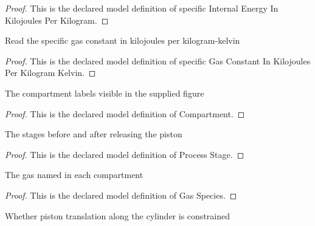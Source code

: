 \begin{proof}
  This is the declared model definition of specific Internal Energy In Kilojoules Per Kilogram.
\end{proof}
\begin{definition}
  \label{def:physics:phyx-mini-0458:phyxminiproblems-problemphyxmini0458-specificgasconstantinkilojoulesperkilogramkelvin}
  Read the specific gas constant in kilojoules per kilogram-kelvin
\end{definition}
\begin{proof}
  This is the declared model definition of specific Gas Constant In Kilojoules Per Kilogram Kelvin.
\end{proof}
\begin{definition}[Compartment]
  \label{def:physics:phyx-mini-0458:phyxminiproblems-problemphyxmini0458-compartment}
  The compartment labels visible in the supplied figure
\end{definition}
\begin{proof}
  This is the declared model definition of Compartment.
\end{proof}
\begin{definition}
  \label{def:physics:phyx-mini-0458:phyxminiproblems-problemphyxmini0458-processstage}
  The stages before and after releasing the piston
\end{definition}
\begin{proof}
  This is the declared model definition of Process Stage.
\end{proof}
\begin{definition}
  \label{def:physics:phyx-mini-0458:phyxminiproblems-problemphyxmini0458-gasspecies}
  The gas named in each compartment
\end{definition}
\begin{proof}
  This is the declared model definition of Gas Species.
\end{proof}
\begin{definition}
  \label{def:physics:phyx-mini-0458:phyxminiproblems-problemphyxmini0458-pistonconstraint}
  Whether piston translation along the cylinder is constrained
\end{definition}

